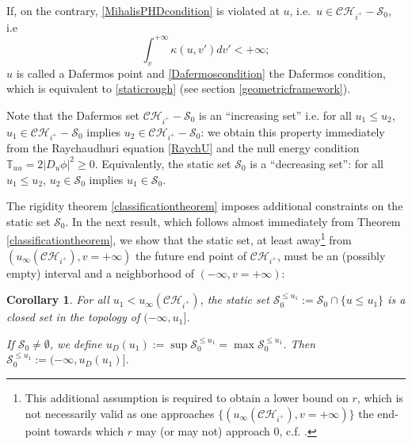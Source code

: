 \documentclass[10pt,a4paper]{article}
\theoremstyle{plain}
\newtheorem{cor}[thm]{Corollary}
\theoremstyle{remark}
\theoremstyle{definition}
\theoremstyle{plain}
\theoremstyle{remark}
\theoremstyle{definition}
\newcommand{\CH}{\mathcal{CH}_{i^+}}
\numberwithin{equation}{section}
\begin{document}
If, on the contrary, \eqref{MihalisPHDcondition} is violated at $u$, i.e.\ $u\in \CH-\mathcal{S}_0$, i.e\ \begin{equation}\label{Dafermoscondition}
\int_v^{+\infty} \kappa(u,v')dv'<+\infty;
\end{equation}  $u$ is called a Dafermos point and \eqref{Dafermoscondition} the Dafermos condition, which is equivalent to \eqref{staticrough} (see section \ref{geometricframework}).

Note that the Dafermos set $\CH-\mathcal{S}_0$ is an ``increasing set'' i.e. for all $u_1 \leq u_2$, $u_1 \in \CH-\mathcal{S}_0$ implies $u_2 \in \CH-\mathcal{S}_0$: we obtain this property immediately from the Raychaudhuri equation \eqref{RaychU} and the null energy condition $\mathbb{T}_{u u}=2|D_u \phi|^2 \geq 0$. Equivalently, the static set $\mathcal{S}_0$ is a ``decreasing set'': for all $u_1 \leq u_2$, $u_2 \in \mathcal{S}_0$ implies $u_1 \in \mathcal{S}_0$.


The rigidity theorem \ref{classificationtheorem} imposes additional constraints on the static set $\mathcal{S}_0$. In the next result, which follows almost immediately from Theorem \ref{classificationtheorem}, we show that the static set, at least away\footnote{This additional assumption is required to obtain a lower bound on $r$, which is not necessarily valid as one approaches $\{(u_{\infty}(\CH),v=+\infty)\}$ the end-point towards which $r$ may (or may not) approach $0$, c.f. \cite{Kommemi}.} from $(u_{\infty}(\CH),v=+\infty)$ the future end point of $\CH$, must be an (possibly empty) interval and a neighborhood of $(-\infty,v=+\infty)$:


\begin{cor} \label{supcorollary}
	For all $u_1 <u_{\infty}(\CH)$, the static set $ \mathcal{S}_0^{\leq u_1}:=\mathcal{S}_0 \cap \{u \leq u_1\}$ is a closed set in the topology of $(-\infty,u_1]$.
	
	If $\mathcal{S}_0 \neq \emptyset$, we define $u_D(u_1):= \sup \mathcal{S}_0^{\leq u_1}= \max \mathcal{S}_0^{\leq u_1}$. Then $\mathcal{S}_0^{\leq u_1}:= (-\infty,u_D(u_1)]$.
	
\end{cor} 
\end{document}
